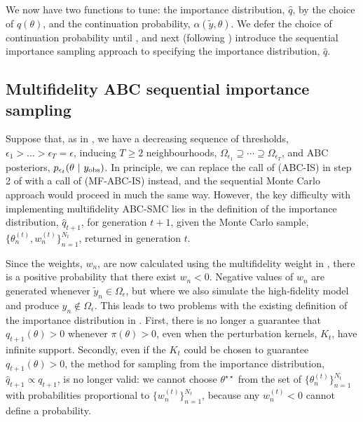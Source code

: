 \documentclass[review,demo]{siamonline190516}
\begin{document}
We now have two functions to tune: the importance distribution, $\hat q$, by the choice of $q(\theta)$, and the continuation probability, $\alpha(\tilde y, \theta)$.
We defer the choice of continuation probability until , and next (following ) introduce the sequential importance sampling approach to specifying the importance distribution, $\hat q$.

\subsection{Multifidelity ABC sequential importance sampling}
\label{s:MF-ABC-SIS}

Suppose that, as in , we have a decreasing sequence of thresholds, $\epsilon_1 > \dots > \epsilon_T = \epsilon$, inducing $T \geq 2$ neighbourhoods, $\Omega_{\epsilon_1} \supseteq \cdots \supseteq \Omega_{\epsilon_T}$, and ABC posteriors, $p_{\epsilon_t}(\theta~|~y_{\mathrm{obs}})$.
In principle, we can replace the call of  (ABC-IS) in step 2 of  with a call of  (MF-ABC-IS) instead, and the sequential Monte Carlo approach would proceed in much the same way.
However, the key difficulty with implementing multifidelity ABC-SMC lies in the definition of the importance distribution, $\hat q_{t+1}$, for generation $t+1$, given the Monte Carlo sample, $\{ \theta_n^{(t)}, w_n^{(t)} \}_{n=1}^{N_t}$, returned in generation $t$. 

Since the weights, $w_n$, are now calculated using the multifidelity weight in , there is a positive probability that there exist $w_n < 0$.
Negative values of $w_n$ are generated whenever $\tilde y_n \in \Omega_\epsilon$, but where we also simulate the high-fidelity model and produce $y_n \notin \Omega_\epsilon$.
This leads to two problems with the existing definition of the importance distribution in .
First, there is no longer a guarantee that $q_{t+1}(\theta) > 0$ whenever $\pi(\theta)>0$, even when the perturbation kernels, $K_t$, have infinite support.
Secondly, even if the $K_t$ could be chosen to guarantee $q_{t+1}(\theta)>0$, the method for sampling from the importance distribution, $\hat q_{t+1} \propto q_{t+1}$, is no longer valid: 
we cannot choose $\theta^{\star \star}$ from the set of $\{ \theta_n^{(t)} \}_{n=1}^{N_t}$ with probabilities proportional to $\{ w_n^{(t)} \}_{n=1}^{N_t}$, because any $w_n^{(t)} < 0$ cannot define a probability.
\end{document}
